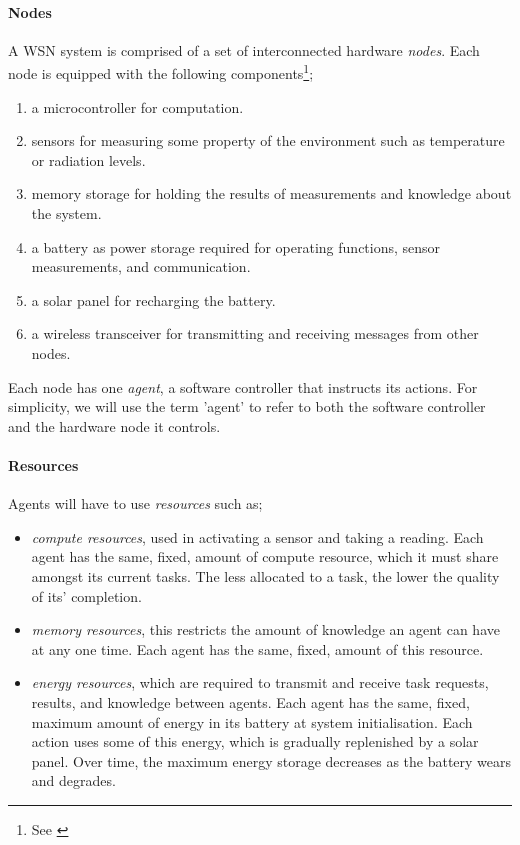 
\label{problem_overview}

\paragraph{Nodes}
A WSN system is comprised of a set of interconnected hardware \textit{nodes}. Each node is equipped with the following components\footnote{See \cite{muhammad_r_ahmed_2012_1072589}};
\begin{enumerate}
	\item a microcontroller for computation.
	\item sensors for measuring some property of the environment such as temperature or radiation levels.
	\item memory storage for holding the results of measurements and knowledge about the system.
	\item a battery as power storage required for operating functions, sensor measurements, and communication.
	\item a solar panel for recharging the battery.
	\item  a wireless transceiver for  transmitting and receiving messages from other nodes.
\end{enumerate}

Each node has one \textit{agent}, a software controller that instructs its actions. For simplicity, we will use the term 'agent' to refer to both the software controller and the hardware node it controls.

\paragraph{Resources}
\label{section:overview:resources}
Agents will have to use \textit{resources} such as;

\begin{itemize}
	\item \textit{compute resources}, used in activating a sensor and taking a reading. Each agent has the same, fixed, amount of compute resource, which it must share amongst its current tasks. The less allocated to a task, the lower the quality of its' completion. 
	\item \textit{memory resources}, this restricts the amount of knowledge an agent can have at any one time. Each agent has the same, fixed, amount of this resource.
	\item \textit{energy resources}, which are required to transmit and receive task requests, results, and knowledge between agents. Each agent has the same, fixed, maximum amount of energy in its battery at system initialisation. Each action uses some of this energy, which is gradually replenished by a solar panel. Over time, the maximum energy storage decreases as the battery wears and degrades.
\end{itemize} 

